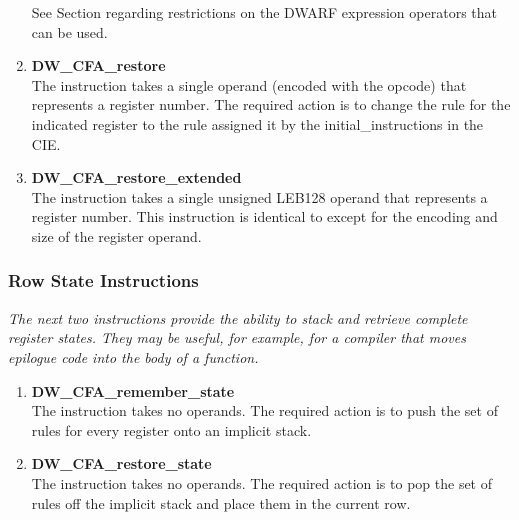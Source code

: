 \begin{enumerate}[1.]
See Section  
regarding restrictions on the DWARF
expression operators that can be used.

\item \textbf{ DW\-\_CFA\-\_restore} \\
The  instruction takes a single operand (encoded
with the opcode) that represents a register number. The
required action is to change the rule for the indicated
register to the rule assigned it by the initial\_instructions
in the CIE.

\item \textbf{DW\-\_CFA\-\_restore\-\_extended} \\
The  instruction takes a single unsigned
LEB128 operand that represents a register number. This
instruction is identical to  except for the
encoding and size of the register operand.

\end{enumerate}

\subsubsection{Row State Instructions}
\label{chap:rowstateinstructions}

\textit{The next two instructions provide the ability to stack and
retrieve complete register states. They may be useful, for
example, for a compiler that moves epilogue code into the
body of a function.}


\begin{enumerate}[1.]

\item \textbf{DW\-\_CFA\-\_remember\-\_state} \\
The  instruction takes no operands. The
required action is to push the set of rules for every register
onto an implicit stack.


\item \textbf{DW\-\_CFA\-\_restore\-\_state} \\
The  instruction takes no operands. The
required action is to pop the set of rules off the implicit
stack and place them in the current row.

\end{enumerate}

